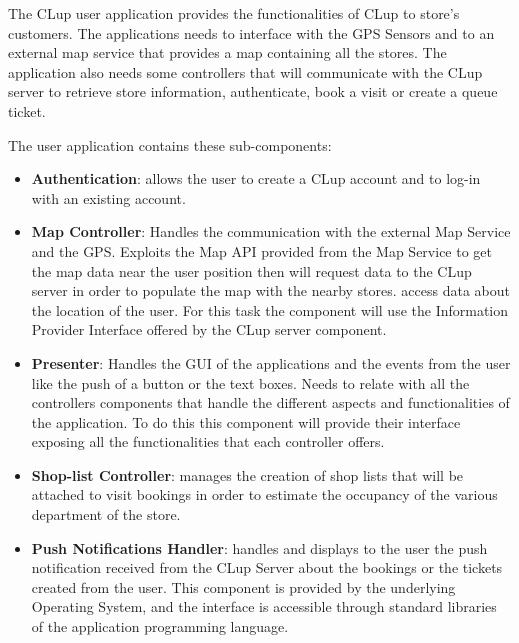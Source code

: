 The CLup user application provides the functionalities of CLup to store's customers. The applications needs to interface with the GPS Sensors and to an external map service that provides a map containing all the stores. The application also needs some controllers that will communicate with the CLup server to retrieve store information, authenticate, book a visit or create a queue ticket.

The user application contains these sub-components:
\begin{itemize}
    \item \textbf{Authentication}: allows the user to create a CLup account and to log-in with an existing account.
    \item \textbf{Map Controller}: Handles the communication with the external Map Service and the GPS. Exploits the Map API provided from the Map Service to get the map data near the user position then will request data to the CLup server in order to populate the map with the nearby stores.  access data about the location of the user. For this task the component will use the Information Provider Interface offered by the CLup server component.
    \item \textbf{Presenter}: Handles the GUI of the applications and the events from the user like the push of a button or the text boxes. Needs to relate with all the controllers components that handle the different aspects and functionalities of the application. To do this this component will provide their interface exposing all the functionalities that each controller offers.
    \item \textbf{Shop-list Controller}: manages the creation of shop lists that will be attached to visit bookings in order to estimate the occupancy of the various department of the store.
    \item \textbf{Push Notifications Handler}: handles and displays to the user the push notification received from the CLup Server about the bookings or the tickets created from the user. This component is provided by the underlying Operating System, and the interface is accessible through standard libraries of the application programming language.
\end{itemize}

